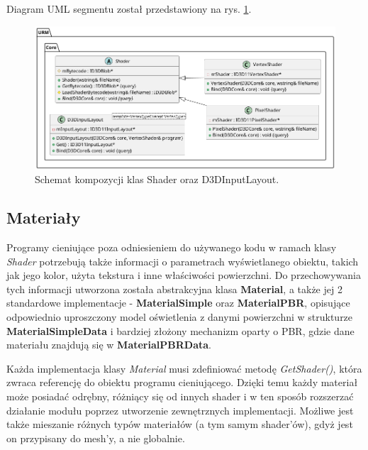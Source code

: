 	Diagram UML segmentu został przedstawiony na rys. \ref{UML_ShaderPipeline}.
	
	\begin{figure}[h!]
		\centering
		\includegraphics[width=\textwidth]{images/UML/shader.png}
		\caption{Schemat kompozycji klas Shader oraz D3DInputLayout.}
		\label{UML_ShaderPipeline}
	\end{figure}
	
	\vfill
	\clearpage
	
\subsection{Materiały}
	Programy cieniujące poza odniesieniem do używanego kodu w ramach klasy \textit{Shader} potrzebują także informacji o parametrach wyświetlanego obiektu, takich jak jego kolor, użyta tekstura i inne właściwości powierzchni.	Do przechowywania tych informacji utworzona została abstrakcyjna klasa \textbf{Material}, a także jej 2 standardowe implementacje - \textbf{MaterialSimple} oraz \textbf{MaterialPBR}, opisujące odpowiednio uproszczony model oświetlenia z danymi powierzchni w strukturze \textbf{MaterialSimpleData} i bardziej złożony mechanizm oparty o PBR, gdzie dane materiału znajdują się w \textbf{MaterialPBRData}.
	
	Każda implementacja klasy \textit{Material} musi zdefiniować metodę \textit{GetShader()}, która zwraca referencję do obiektu programu cieniującego. Dzięki temu każdy materiał może posiadać odrębny, różniący się od innych shader i w ten sposób rozszerzać działanie modułu poprzez utworzenie zewnętrznych implementacji. Możliwe jest także mieszanie różnych typów materiałów (a tym samym shader'ów), gdyż jest on przypisany do mesh'y, a nie globalnie.
		
